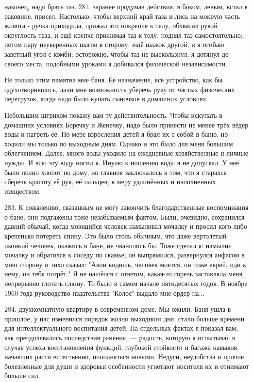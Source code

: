 наконец, надо брать таз. 281. заранее продумав действия, я боком, левым, встал к раковине, присел. Настолько, чтобы верхний край таза и лись на мокрую часть живота - ручка приходила, прижал это покрепче к телу, обхватил рукой округлость таза, и ещё крепче прижимая таз к телу, поднял таз самостоятельно; потом пару неуверенных шагов в сторону. ещё шажок другой, и я огибаю заветный угол с комби; осторожно, чтобы таз не выскользнул, я дотянул до своего места, подобными уроками я добивался физической независимости.

Не только этим памятна мне баня. Её назначение, всё устройство, как бы одухотворившись, дали мне возможность уберечь руку от частых физических перегрузок, когда надо было купать сыночков в домашних условиях.

Небольшим штрихом покажу вам ту действительность. Чтобы искупать в домашних условиях Боречку и Женечку, надо было принести не менее трёх вёдер воды и нагреть её. По мере взросления детей я брал их с собой в баню, но ходили мы только по выходным дням. Однако и это было для меня большим облегчением. Далее, много воды уходило на ежедневные хозяйственные и личные нужды. И всю эту воду носил я. Инулю к ношению воды я не допускал. У неё было полно хлопот по дому, но главное заключалось в том, что я старался сберечь красоту её рук, её пальцев, в меру удлинённых и наполненных изяществом.

283. К сожалению, сказанным не могу закончить благодарственные воспоминания о бане, они подгажены тоже незабываемым фактом. Были, очевидно, сохранился давний обычай, когда моющийся человек намыливал мочалку и просил кого-либо крепенько потереть спину. Это было столь обычным, что даже вертолетый иконкий человек, окажись в бане, не чванились бы. Тоже сделал я: намылил мочалку и обратился к соседу по скамье; он выпрямился, развернулся анфасом в мою сторону и тихо сказал: "Авон видишь, человек моется, он тоже еврей, иди к нему, он тебя потрёт." Я не нашёлся с ответом, какая-то горечь заставляла меня непрерывно глотать слюну. То было в самом начале пятидесятых годов. В ноябре 1960 года руководство издательства "Колос" выдало мне ордер на...

284. двухкомнатную квартиру в современном доме. Мы ожили. Баня ушла в прошлое, у нас изменился порядок жизни выходного дня: стало больше времени для интеллектуального воспитания детей. На отдельных фактах я показал вам, как преодолевались последствия ранения, — радость, которую я испытывал в случае успеха восстановления функций, глубокой стойкости и багажа навыков, начавших расти естественно, пополняться новыми. Недуги, неудобства и прочие болезненные для души и здоровья особенности угнетают носителя их и отнимают больше сил.

